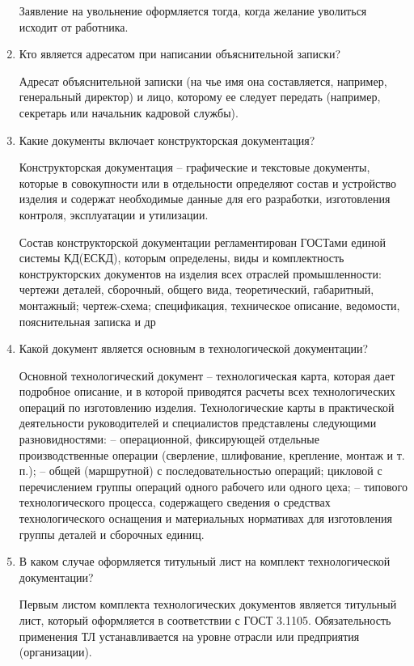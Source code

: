 \documentclass[a4paper,10pt]{article}
\theoremstyle{plain} %
\theoremstyle{definition} %
\theoremstyle{remark} %
\begin{document}
\begin{enumerate}
	Заявление на увольнение оформляется тогда, когда желание уволиться исходит от работника.

	\item Кто является адресатом при написании объяснительной записки?
	
	Адресат объяснительной записки (на чье имя она составляется, например, генеральный директор) и лицо, которому ее следует передать (например, секретарь или начальник кадровой службы).

	\item Какие документы включает конструкторская документация?
	
	Конструкторская документация – графические и текстовые документы, которые в совокупности или в отдельности определяют состав и устройство изделия и содержат необходимые данные для его разработки, изготовления контроля, эксплуатации и утилизации.
	
	Состав конструкторской документации регламентирован ГОСТами единой системы КД(ЕСКД), которым определены, виды и комплектность конструкторских документов на изделия всех отраслей промышленности: чертежи деталей, сборочный, общего вида, теоретический, габаритный, монтажный; чертеж-схема; спецификация, техническое описание, ведомости, пояснительная записка и др
	
	\item Какой документ является основным в технологической документации?
	
	Основной технологический документ – технологическая карта, которая дает подробное описание, и в которой приводятся расчеты всех технологических операций по изготовлению изделия. Технологические карты в практической деятельности руководителей и специалистов представлены следующими разновидностями:
	– операционной, фиксирующей отдельные производственные операции (сверление, шлифование, крепление, монтаж и т. п.);
	– общей (маршрутной) с последовательностью операций; цикловой с перечислением группы операций одного рабочего или одного цеха;
	– типового технологического процесса, содержащего сведения о средствах технологического оснащения и материальных нормативах для изготовления группы деталей и сборочных единиц.
	

	\item В каком случае оформляется титульный лист на комплект технологической документации?
	
	Первым листом комплекта технологических документов является титульный лист, который оформляется в соответствии с ГОСТ 3.1105. Обязательность применения ТЛ устанавливается на уровне отрасли или предприятия (организации).


\end{enumerate}
\end{document}
